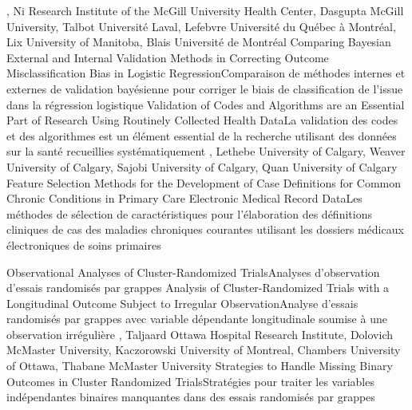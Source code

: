 {
,  {Ni}
{Research Institute of the McGill University Health Center},  {Dasgupta}
{McGill University},  {Talbot}
{Université Laval},  {Lefebvre}
{Université du Québec à Montréal},  {Lix}
{University of Manitoba},  {Blais}
{Université de Montréal}
}
{Comparing Bayesian External and Internal Validation Methods in Correcting Outcome Misclassification Bias in Logistic Regression}{Comparaison de méthodes internes et externes de validation bayésienne pour corriger le biais de classification de l'issue dans la régression logistique}
{\bubbleE \enspace \screenE}
{
}
{Validation of Codes and Algorithms are an Essential Part of Research Using Routinely Collected Health Data}{La validation des codes et des algorithmes est un élément essential de la recherche utilisant des données sur la santé recueillies systématiquement }
{\bubbleE \enspace \screenE}
{
,  {Lethebe}
{University of Calgary},  {Weaver}
{University of Calgary},  {Sajobi}
{University of Calgary},  {Quan}
{University of Calgary}
}
{Feature Selection Methods for the Development of Case Definitions for Common Chronic Conditions in Primary Care Electronic Medical Record Data}{Les méthodes de sélection de caractéristiques pour l'élaboration des définitions cliniques de cas des maladies chroniques courantes utilisant les dossiers médicaux électroniques de soins primaires}
{\bubbleE \enspace \screenE}


{
}
{Observational Analyses of Cluster-Randomized Trials}{Analyses d’observation d’essais randomisés par grappes}
{\bubbleE \enspace \screenE}
{
}
{Analysis of Cluster-Randomized Trials with a Longitudinal Outcome Subject to Irregular Observation}{Analyse d’essais randomisés par grappes avec variable dépendante longitudinale soumise à une observation irrégulière}
{\bubbleE \enspace \screenE}
{
,  {Taljaard}
{Ottawa Hospital Research Institute},  {Dolovich}
{McMaster University},  {Kaczorowski}
{University of Montreal},  {Chambers}
{University of Ottawa},  {Thabane}
{McMaster University}
}
{Strategies to Handle Missing Binary Outcomes in Cluster Randomized Trials}{Stratégies pour traiter les variables indépendantes binaires manquantes dans des essais randomisés par grappes}
{\bubbleE \enspace \screenE}

